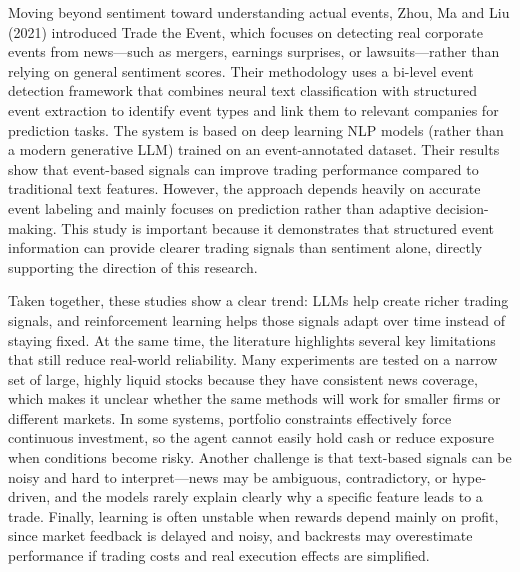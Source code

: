 \documentclass[a4paper,fleqn]{cas-sc}
\begin{document}
Moving beyond sentiment toward understanding actual events, Zhou, Ma and Liu (2021) introduced Trade the Event, which focuses on detecting real corporate events from news—such as mergers, earnings surprises, or lawsuits—rather than relying on general sentiment scores. Their methodology uses a bi-level event detection framework that combines neural text classification with structured event extraction to identify event types and link them to relevant companies for prediction tasks. The system is based on deep learning NLP models (rather than a modern generative LLM) trained on an event-annotated dataset. Their results show that event-based signals can improve trading performance compared to traditional text features. However, the approach depends heavily on accurate event labeling and mainly focuses on prediction rather than adaptive decision-making. This study is important because it demonstrates that structured event information can provide clearer trading signals than sentiment alone, directly supporting the direction of this research. 
 
Taken together, these studies show a clear trend: LLMs help create richer trading signals, and reinforcement learning helps those signals adapt over time instead of staying fixed. At the same time, the literature highlights several key limitations that still reduce real-world reliability. Many experiments are tested on a narrow set of large, highly liquid stocks because they have consistent news coverage, which makes it unclear whether the same methods will work for smaller firms or different markets. In some systems, portfolio constraints effectively force continuous investment, so the agent cannot easily hold cash or reduce exposure when conditions become risky. Another challenge is that text-based signals can be noisy and hard to interpret—news may be ambiguous, contradictory, or hype-driven, and the models rarely explain clearly why a specific feature leads to a trade. Finally, learning is often unstable when rewards depend mainly on profit, since market feedback is delayed and noisy, and backrests may overestimate performance if trading costs and real execution effects are simplified.
\end{document}
